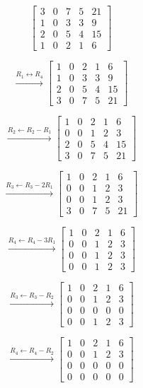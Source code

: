 \begin{answer}
    $$
    \left[
    \begin{array}{cccc|c}
    3&0&7&5&21\\
    1&0&3&3&9\\
    2&0&5&4&15\\
    1&0&2&1&6
    \end{array}
    \right]
    $$

    $$
    \xrightarrow{R_1\leftrightarrow R_4}
    \left[
    \begin{array}{cccc|c}
    1&0&2&1&6\\
    1&0&3&3&9\\
    2&0&5&4&15\\
    3&0&7&5&21
    \end{array}
    \right]
    $$

    $$
    \xrightarrow{R_2\leftarrow R_2-R_1}
    \left[
    \begin{array}{cccc|c}
    1&0&2&1&6\\
    0&0&1&2&3\\
    2&0&5&4&15\\
    3&0&7&5&21
    \end{array}
    \right]
    $$

    $$
    \xrightarrow{R_3\leftarrow R_3-2R_1}
    \left[
    \begin{array}{cccc|c}
    1&0&2&1&6\\
    0&0&1&2&3\\
    0&0&1&2&3\\
    3&0&7&5&21
    \end{array}
    \right]
    $$

    $$
    \xrightarrow{R_4\leftarrow R_4-3R_1}
    \left[
    \begin{array}{cccc|c}
    1&0&2&1&6\\
    0&0&1&2&3\\
    0&0&1&2&3\\
    0&0&1&2&3
    \end{array}
    \right]
    $$

    $$
    \xrightarrow{R_3\leftarrow R_3-R_2}
    \left[
    \begin{array}{cccc|c}
    1&0&2&1&6\\
    0&0&1&2&3\\
    0&0&0&0&0\\
    0&0&1&2&3
    \end{array}
    \right]
    $$

    $$
    \xrightarrow{R_4\leftarrow R_4-R_2}
    \left[
    \begin{array}{cccc|c}
    1&0&2&1&6\\
    0&0&1&2&3\\
    0&0&0&0&0\\
    0&0&0&0&0
    \end{array}
    \right]
    $$


\end{answer}
